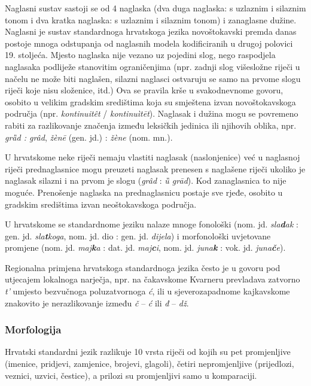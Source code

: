 \begin{multicols}{2}
Naglasni sustav sastoji se od 4 naglaska (dva duga naglaska: s uzlaznim i silaznim tonom i dva kratka naglaska: s uzlaznim i silaznim tonom) i zanaglasne dužine. Naglasni je sustav standardnoga hrvatskoga jezika novoštokavski premda danas postoje mnoga odstupanja od naglasnih modela kodificiranih u drugoj polovici 19. stoljeća. Mjesto naglaska nije vezano uz pojedini slog, nego raspodjela naglasaka podliježe stanovitim ograničenjima (npr. zadnji slog višesložne riječi u načelu ne može biti naglašen, silazni naglasci ostvaruju se samo na prvome slogu riječi koje nisu složenice, itd.) Ova se pravila krše u svakodnevnome govoru, osobito u velikim gradskim središtima koja su smještena izvan novoštokavskoga područja (npr. \emph{kontinuitêt} / \emph{kontinuìtēt}). Naglasak i dužina mogu se povremeno rabiti za razlikovanje značenja između leksičkih jedinica ili njihovih oblika, npr. \emph{grȁd : grâd}, \emph{žènē} (gen. jd.) : \emph{žène} (nom. mn.).

U hrvatskome neke riječi nemaju vlastiti naglasak (naslonjenice) već u naglasnoj riječi prednaglasnice mogu preuzeti naglasak prenesen s naglašene riječi ukoliko je naglasak silazni i na prvom je slogu (\emph{grâd} : \emph{ȕ grād}). Kod zanaglasnica to nije moguće. Prenošenje naglaska na prednaglasnicu postaje sve rjeđe, osobito u gradskim središtima izvan neoštokavskoga područja.

U hrvatskome se standardnome jeziku nalaze mnoge fonološki (nom. jd. \emph{sla\textbf{d}ak} : gen. jd. \emph{sla\textbf{t}koga}, nom. jd. dio : gen. jd. \emph{dijela}) i morfonološki uvjetovane promjene (nom. jd. \emph{maj\textbf{k}a} : dat. jd. \emph{maj\textbf{c}i}, nom. jd. \emph{juna\textbf{k}} : vok. jd. \emph{juna\textbf{č}e}).

Regionalna primjena hrvatskoga standardnoga jezika često je u govoru pod utjecajem lokalnoga narječja, npr. na čakavskome Kvarneru prevladava zatvorno \emph{t'} umjesto bezvučnoga poluzatvornoga \emph{ć}, ili u sjeverozapadnome kajkavskome znakovito je nerazlikovanje između \emph{č} – \emph{ć} ili \emph{đ} – \emph{dž}.

\subsubsection{Morfologija}

Hrvatski standardni jezik razlikuje 10 vrsta riječi od kojih su pet promjenljive (imenice, pridjevi, zamjenice, brojevi, glagoli), četiri nepromjenljive (prijedlozi, veznici, uzvici, čestice), a prilozi su promjenljivi samo u komparaciji.


\end{multicols}
